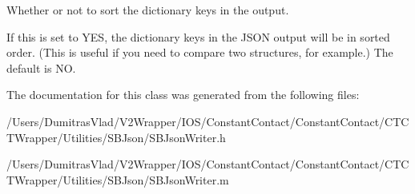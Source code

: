 Whether or not to sort the dictionary keys in the output. 

If this is set to Y\-E\-S, the dictionary keys in the J\-S\-O\-N output will be in sorted order. (This is useful if you need to compare two structures, for example.) The default is N\-O. 

The documentation for this class was generated from the following files\-:\begin{DoxyCompactItemize}
\item 
/\-Users/\-Dumitras\-Vlad/\-V2\-Wrapper/\-I\-O\-S/\-Constant\-Contact/\-Constant\-Contact/\-C\-T\-C\-T\-Wrapper/\-Utilities/\-S\-B\-Json/S\-B\-Json\-Writer.\-h\item 
/\-Users/\-Dumitras\-Vlad/\-V2\-Wrapper/\-I\-O\-S/\-Constant\-Contact/\-Constant\-Contact/\-C\-T\-C\-T\-Wrapper/\-Utilities/\-S\-B\-Json/S\-B\-Json\-Writer.\-m\end{DoxyCompactItemize}
